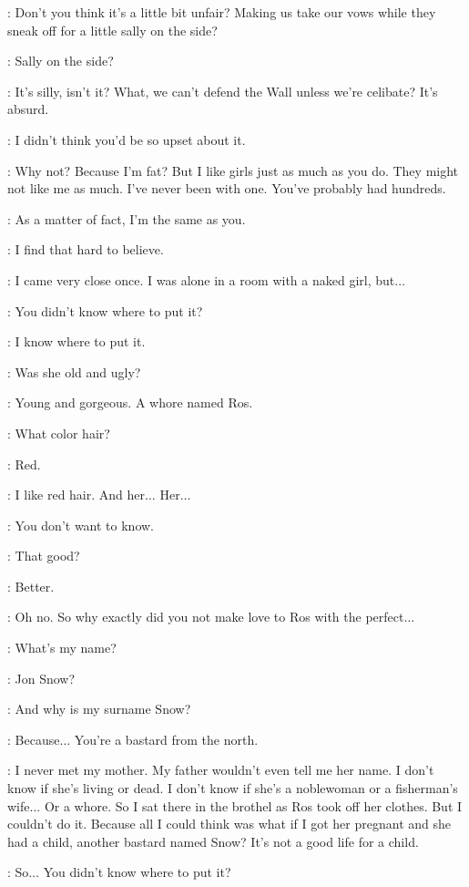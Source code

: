 \SAM: Don't you think it's a little bit unfair? Making us take our vows while they sneak off for a little sally on the side? 

\JON: Sally on the side? 

\SAM: It's silly, isn't it? What, we can't defend the Wall unless we're celibate? It's absurd. 

\JON: I didn't think you'd be so upset about it. 

\SAM: Why not? Because I'm fat? But I like girls just as much as you do. They might not like me as much. I've never been with one. You've probably had hundreds. 

\JON: As a matter of fact, I'm the same as you. 

\SAM: I find that hard to believe. 

\JON: I came very close once. I was alone in a room with a naked girl, but$\ldots$ 

\SAM: You didn't know where to put it? 

\JON: I know where to put it. 

\SAM: Was she old and ugly? 

\JON: Young and gorgeous. A whore named Ros. 

\SAM: What color hair? 

\JON: Red. 

\SAM: I like red hair. And her$\ldots$ Her$\ldots$ 

\JON: You don't want to know. 

\SAM: That good? 

\JON: Better. 

\SAM: Oh no. So why exactly did you not make love to Ros with the perfect$\ldots$ 

\JON: What's my name? 

\SAM: Jon Snow? 

\JON: And why is my surname Snow? 

\SAM: Because$\ldots$ You're a bastard from the north. 

\JON: I never met my mother. My father wouldn't even tell me her name. I don't know if she's living or dead. I don't know if she's a noblewoman or a fisherman's wife$\ldots$ Or a whore. So I sat there in the brothel as Ros took off her clothes. But I couldn't do it. Because all I could think was what if I got her pregnant and she had a child, another bastard named Snow? It's not a good life for a child. 

\SAM: So$\ldots$ You didn't know where to put it? 


